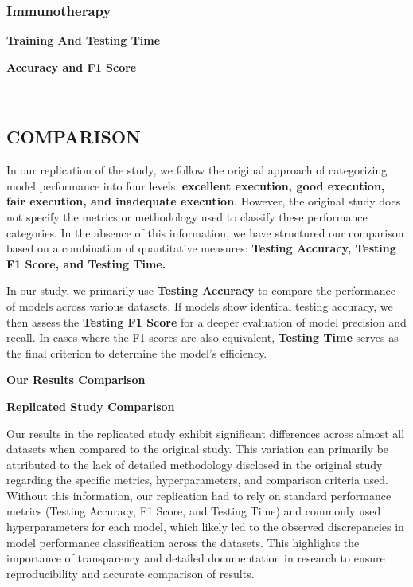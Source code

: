 \documentclass[11pt]{article}
\begin{document}
    \hypertarget{immunotherapy}{%
\subsubsection{Immunotherapy}\label{immunotherapy}}

    \textbf{Training And Testing Time}

    

    \textbf{Accuracy and F1 Score}

    \begin{center}
    \end{center}
    { \hspace*{\fill} \\}
    
    \hypertarget{comparison}{%
\subsection{COMPARISON}\label{comparison}}

    In our replication of the study, we follow the original approach of
categorizing model performance into four levels: \textbf{excellent
execution, good execution, fair execution, and inadequate execution}.
However, the original study does not specify the metrics or methodology
used to classify these performance categories. In the absence of this
information, we have structured our comparison based on a combination of
quantitative measures: \textbf{Testing Accuracy, Testing F1 Score, and
Testing Time.}

In our study, we primarily use \textbf{Testing Accuracy} to compare the
performance of models across various datasets. If models show identical
testing accuracy, we then assess the \textbf{Testing F1 Score} for a
deeper evaluation of model precision and recall. In cases where the F1
scores are also equivalent, \textbf{Testing Time} serves as the final
criterion to determine the model's efficiency.

    \textbf{Our Results Comparison}

    

    \textbf{Replicated Study Comparison}

    

    Our results in the replicated study exhibit significant differences
across almost all datasets when compared to the original study. This
variation can primarily be attributed to the lack of detailed
methodology disclosed in the original study regarding the specific
metrics, hyperparameters, and comparison criteria used. Without this
information, our replication had to rely on standard performance metrics
(Testing Accuracy, F1 Score, and Testing Time) and commonly used
hyperparameters for each model, which likely led to the observed
discrepancies in model performance classification across the datasets.
This highlights the importance of transparency and detailed
documentation in research to ensure reproducibility and accurate
comparison of results.


    
    
    
\end{document}
